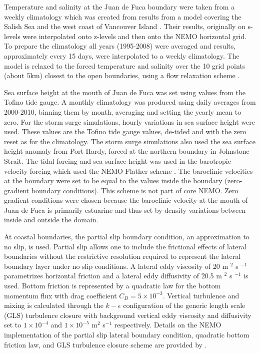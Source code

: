 \documentclass[pdftex,10pt]{article}
\begin{document}
Temperature and salinity at the Juan de Fuca boundary were taken from a weekly climatology which was created from results from a model covering the Salish Sea and the west coast of Vancouver Island \citep{massonfine2012}.  Their results, originally on s-levels were interpolated onto z-levels and then onto the NEMO horizontal grid.  To prepare the climatology all years (1995-2008) were averaged and results, approximately every 15 days, were interpolated to a weekly climatology. The model is relaxed to the forced temperature and salinity over the 10 grid points (about 5km) closest to the open boundaries, using a flow relaxation scheme \citep{engedahl1995use}. %

Sea surface height at the mouth of Juan de Fuca was set using values from the Tofino tide gauge.  A monthly climatology was produced using daily averages from 2000-2010, binning them by month, averaging and setting the yearly mean to zero.  For the storm surge simulations, hourly variations in sea surface height were used.  These values are the Tofino tide gauge values, de-tided and with the zero reset as for the climatology. The storm surge simulations also used the sea surface height anomaly from Port Hardy, forced at the northern boundary in Johnstone Strait. The tidal forcing and sea surface height was used in the barotropic velocity forcing which used the NEMO Flather scheme \citep{flather1994storm, madec2012nemo}.
The baroclinic velocities at the boundary were set to be equal to the values inside the boundary (zero-gradient boundary conditions).  This scheme is not part of core NEMO.  Zero gradient conditions were chosen because the baroclinic velocity at the mouth of Juan de Fuca is primarily estuarine and thus set by density variations between inside and outside the domain.

At coastal boundaries, the partial slip boundary condition, an approximation to no slip, is used. Partial slip allows one to include the frictional effects of lateral boundaries without the restrictive resolution required to represent the lateral boundary layer under no slip conditions. A lateral eddy viscosity of 20 m $^2$ s $^{-1}$ parametrizes horizontal friction and a lateral eddy diffusivity of 20.5 m $^2$ s $^{-1}$ is used.  Bottom friction is represented by a quadratic law for the bottom momentum flux with drag coefficient $C_D = 5\times 10^{-3}$. Vertical turbulence and mixing is calculated through the $k-\epsilon$ configuration of the generic length scale (GLS) turbulence closure \citep{umlauf2003generic} with background vertical eddy viscosity and diffusivity set to $1\times10^{-4}$ and $1\times10^{-5}$ m$^2$ s$^{-1}$ respectively. Details on the NEMO implementation of the partial slip lateral boundary condition, quadratic bottom friction law, and GLS turbulence closure scheme are provided by \citet{madec2012nemo}.
\end{document}
